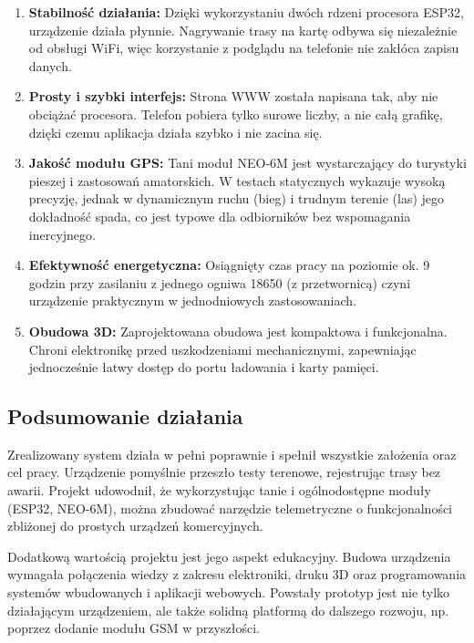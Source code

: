 \documentclass[12pt, a4paper]{EE-dyplom}
\begin{document}
\begin{enumerate}
    \item \textbf{Stabilność działania:} Dzięki wykorzystaniu dwóch rdzeni procesora ESP32, urządzenie działa płynnie. Nagrywanie trasy na kartę odbywa się niezależnie od obsługi WiFi, więc korzystanie z podglądu na telefonie nie zakłóca zapisu danych.
    \item \textbf{Prosty i szybki interfejs:} Strona WWW została napisana tak, aby nie obciążać procesora. Telefon pobiera tylko surowe liczby, a nie całą grafikę, dzięki czemu aplikacja działa szybko i nie zacina się.
    \item \textbf{Jakość modułu GPS:} Tani moduł NEO-6M jest wystarczający do turystyki pieszej i zastosowań amatorskich. W testach statycznych wykazuje wysoką precyzję, jednak w dynamicznym ruchu (bieg) i trudnym terenie (las) jego dokładność spada, co jest typowe dla odbiorników bez wspomagania inercyjnego.
    \item \textbf{Efektywność energetyczna:} Osiągnięty czas pracy na poziomie ok. 9 godzin przy zasilaniu z jednego ogniwa 18650 (z przetwornicą) czyni urządzenie praktycznym w jednodniowych zastosowaniach.
    \item \textbf{Obudowa 3D:} Zaprojektowana obudowa jest kompaktowa i funkcjonalna. Chroni elektronikę przed uszkodzeniami mechanicznymi, zapewniając jednocześnie łatwy dostęp do portu ładowania i karty pamięci.
\end{enumerate}

\subsection{Podsumowanie działania}
Zrealizowany system działa w pełni poprawnie i spełnił wszystkie założenia oraz cel pracy. Urządzenie pomyślnie przeszło testy terenowe, rejestrując trasy bez awarii. Projekt udowodnił, że wykorzystując tanie i ogólnodostępne moduły (ESP32, NEO-6M), można zbudować narzędzie telemetryczne o funkcjonalności zbliżonej do prostych urządzeń komercyjnych.

Dodatkową wartością projektu jest jego aspekt edukacyjny. 
Budowa urządzenia wymagała połączenia wiedzy z zakresu elektroniki,
 druku 3D oraz programowania systemów wbudowanych i aplikacji webowych. 
 Powstały prototyp jest nie tylko działającym urządzeniem, ale także solidną platformą 
 do dalszego rozwoju, np. poprzez dodanie modułu GSM w przyszłości.
\end{document}
